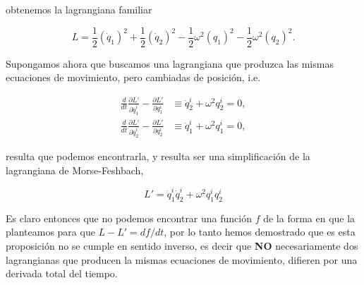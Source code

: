 \documentclass[a4paper,10pt]{article}
\numberwithin{equation}{section}
\begin{document}
obtenemos la lagrangiana familiar

\begin{equation}
 L = \frac{1}{2} (\dot{q}_1)^2 + \frac{1}{2} (\dot{q}_2)^2 - \frac{1}{2} \omega^2 (q_1)^2 
 - \frac{1}{2} \omega^2 (q_2)^2.
\end{equation}

Supongamos ahora que buscamos una lagrangiana que produzca las mismas ecuaciones de 
movimiento, pero cambiadas de posición, i.e.

\begin{align}
 \frac{d}{dt}\frac{\partial L'}{\partial \dot{q}^i_1} - \frac{\partial L'}{\partial q^i_1} 
 &\equiv \ddot{q}^i_2 + \omega^2 q^i_2 = 0, \\
 \frac{d}{dt}\frac{\partial L'}{\partial \dot{q}^i_2} - \frac{\partial L'}{\partial q^i_2} 
 &\equiv  \ddot{q}^i_1 + \omega^2 q^i_1 = 0,
\end{align}

resulta que podemos encontrarla, y resulta ser una simplificación de la lagrangiana 
de Morse-Feshbach, 

\begin{equation}
 L' = \dot{q}^i_1\dot{q}^i_2 + \omega^2 q^i_1 q^i_2
\end{equation}

Es claro entonces que no podemos encontrar una función $f$ de la forma en que la planteamos 
para que $L - L' = df/dt$, por lo tanto hemos demostrado que es esta proposición no 
se cumple en sentido inverso, es decir que \textbf{NO} necesariamente dos lagrangianas que 
producen la mismas ecuaciones de movimiento, difieren por una derivada total del tiempo. 
\end{document}
